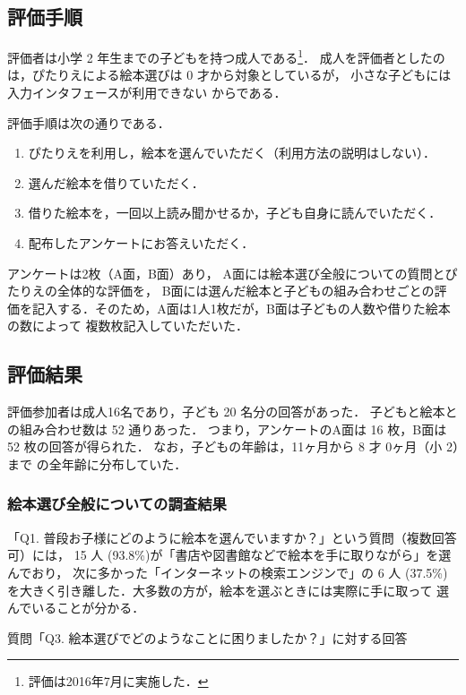 \documentclass[japanese]{jnlp_1.4}
\begin{document}
\subsection{評価手順}\label{sec:qa-order}

評価者は小学 2 年生までの子どもを持つ成人である\footnote{評価は2016年7月に実施した．}．
\pagebreak
成人を評価者としたのは，ぴたりえによる絵本選びは 0 才から対象としているが，
小さな子どもには入力インタフェースが利用できない
からである．


評価手順は次の通りである．
\begin{enumerate}
\item ぴたりえを利用し，絵本を選んでいただく（利用方法の説明はしない）．
\item 選んだ絵本を借りていただく．
\item 借りた絵本を，一回以上読み聞かせるか，子ども自身に読んでいただく．
\item 配布したアンケートにお答えいただく．
\end{enumerate}

アンケートは2枚（A面，B面）あり，
A面には絵本選び全般についての質問とぴたりえの全体的な評価を，
B面には選んだ絵本と子どもの組み合わせごとの評価を記入する．そのため，A面は1人1枚だが，B面は子どもの人数や借りた絵本の数によって
複数枚記入していただいた．


\subsection{評価結果}
\label{sec:qa-res}



評価参加者は成人16名であり，子ども 20 名分の回答があった．
子どもと絵本との組み合わせ数は 52 通りあった．
つまり，アンケートのA面は 16 枚，B面は 52 枚の回答が得られた．
なお，子どもの年齢は，11ヶ月から 8 才 0ヶ月（小 2）まで
の全年齢に分布していた．


\subsubsection{絵本選び全般についての調査結果}
\label{sec:qa-common}

「Q1. 普段お子様にどのように絵本を選んでいますか？」という質問（複数回答可）には，
15 人 (93.8\%)が「書店や図書館などで絵本を手に取りながら」を選んでおり，
次に多かった「インターネットの検索エンジンで」の 6 人 (37.5\%)
を大きく引き離した．大多数の方が，絵本を選ぶときには実際に手に取って
選んでいることが分かる．

\begin{table}[b] 
\caption{質問「Q3. 絵本選びでどのようなことに困りましたか？」に対する回答}
\label{tb:eva-Q3}

\end{table}
\end{document}
